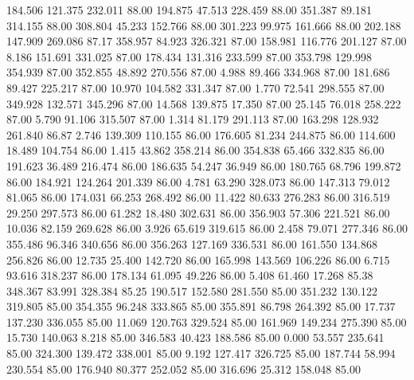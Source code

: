  184.506  121.375  232.011        88.00
 194.875   47.513  228.459        88.00
 351.387   89.181  314.155        88.00
 308.804   45.233  152.766        88.00
 301.223   99.975  161.666        88.00
 202.188  147.909  269.086        87.17
 358.957   84.923  326.321        87.00
 158.981  116.776  201.127        87.00
   8.186  151.691  331.025        87.00
 178.434  131.316  233.599        87.00
 353.798  129.998  354.939        87.00
 352.855   48.892  270.556        87.00
   4.988   89.466  334.968        87.00
 181.686   89.427  225.217        87.00
  10.970  104.582  331.347        87.00
   1.770   72.541  298.555        87.00
 349.928  132.571  345.296        87.00
  14.568  139.875   17.350        87.00
  25.145   76.018  258.222        87.00
   5.790   91.106  315.507        87.00
   1.314   81.179  291.113        87.00
 163.298  128.932  261.840        86.87
   2.746  139.309  110.155        86.00
 176.605   81.234  244.875        86.00
 114.600   18.489  104.754        86.00
   1.415   43.862  358.214        86.00
 354.838   65.466  332.835        86.00
 191.623   36.489  216.474        86.00
 186.635   54.247   36.949        86.00
 180.765   68.796  199.872        86.00
 184.921  124.264  201.339        86.00
   4.781   63.290  328.073        86.00
 147.313   79.012   81.065        86.00
 174.031   66.253  268.492        86.00
  11.422   80.633  276.283        86.00
 316.519   29.250  297.573        86.00
  61.282   18.480  302.631        86.00
 356.903   57.306  221.521        86.00
  10.036   82.159  269.628        86.00
   3.926   65.619  319.615        86.00
   2.458   79.071  277.346        86.00
 355.486   96.346  340.656        86.00
 356.263  127.169  336.531        86.00
 161.550  134.868  256.826        86.00
  12.735   25.400  142.720        86.00
 165.998  143.569  106.226        86.00
   6.715   93.616  318.237        86.00
 178.134   61.095   49.226        86.00
   5.408   61.460   17.268        85.38
 348.367   83.991  328.384        85.25
 190.517  152.580  281.550        85.00
 351.232  130.122  319.805        85.00
 354.355   96.248  333.865        85.00
 355.891   86.798  264.392        85.00
  17.737  137.230  336.055        85.00
  11.069  120.763  329.524        85.00
 161.969  149.234  275.390        85.00
  15.730  140.063    8.218        85.00
 346.583   40.423  188.586        85.00
   0.000   53.557  235.641        85.00
 324.300  139.472  338.001        85.00
   9.192  127.417  326.725        85.00
 187.744   58.994  230.554        85.00
 176.940   80.377  252.052        85.00
 316.696   25.312  158.048        85.00
